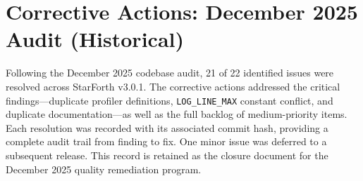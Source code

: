 
\section*{Corrective Actions: December 2025 Audit (Historical)}

Following the December 2025 codebase audit, 21 of 22 identified issues were
resolved across StarForth v3.0.1. The corrective actions addressed the critical
findings---duplicate profiler definitions, \texttt{LOG\_LINE\_MAX} constant
conflict, and duplicate documentation---as well as the full backlog of
medium-priority items. Each resolution was recorded with its associated commit
hash, providing a complete audit trail from finding to fix. One minor issue was
deferred to a subsequent release. This record is retained as the closure
document for the December 2025 quality remediation program.
